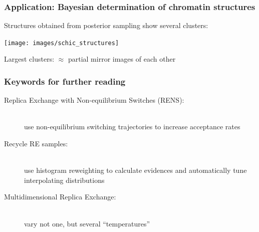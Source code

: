 \documentclass[t,aspectratio=169]{beamer}
\begin{document}
\begin{frame}
  \frametitle{Application: Bayesian determination of chromatin structures}
  Structures obtained from posterior sampling show several clusters:
  \begin{center}
    \texttt{[image: images/schic\_structures]}
  \end{center}
   Largest clusters: $\approx$ partial mirror images of each other
\end{frame}

\begin{frame}
  \frametitle{Keywords for further reading}
  \begin{description}
  \item[Replica Exchange with Non-equilibrium Switches (RENS):] \hfill \\
    use non-equilibrium switching trajectories to increase acceptance rates
  \item[Recycle RE samples:] \hfill \\
    use histogram reweighting to calculate evidences and automatically tune interpolating distributions
  \item[Multidimensional Replica Exchange:] \hfill \\
    vary not one, but several ``temperatures''
  \end{description}
\end{frame}
\end{document}
